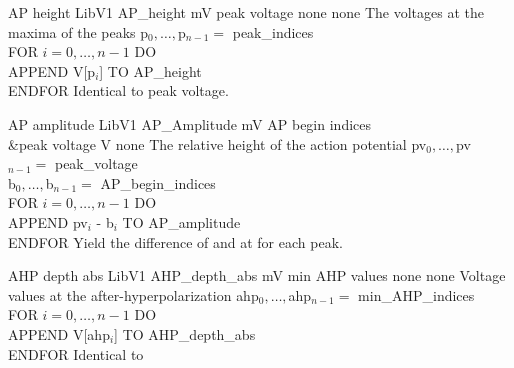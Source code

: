 \begin{efeature}
  {AP height}
  {LibV1}
  {AP\_height}
  {mV}
  {peak voltage}
  {none}
  {none}
  {The voltages at the maxima of the peaks}
  {
  p$_0, \ldots, $p$_{n-1} =$ peak\_indices \\
  FOR $i = 0, \dots, n - 1$ DO \+ \\
    APPEND V[p$_i$] TO AP\_height \- \\
  ENDFOR
  }
  Identical to peak voltage.
\end{efeature}

\begin{efeature}
  {AP amplitude}
  {LibV1}
  {AP\_Amplitude}
  {mV}
  {AP begin indices\\&peak voltage}
  {V}
  {none}
  {The relative height of the action potential}
  {
  pv$_0, \ldots, $pv$_{n-1} =$ peak\_voltage \\
  b$_0, \ldots, $b$_{n-1} =$ AP\_begin\_indices \\
  FOR $i = 0, \dots, n - 1$ DO \+ \\
    APPEND pv$_i$ - b$_i$ TO AP\_amplitude \- \\
  ENDFOR
  }
  Yield the difference of  and  at  for each peak.
  
\end{efeature}

\begin{efeature}
  {AHP depth abs}
  {LibV1}
  {AHP\_depth\_abs}
  {mV}
  {min AHP values}
  {none}
  {none}
  {Voltage values at the after-hyperpolarization}
  {
  ahp$_0, \ldots, $ahp$_{n-1} =$ min\_AHP\_indices \\
  FOR $i = 0, \dots, n - 1$ DO \+ \\
    APPEND V[ahp$_i$] TO AHP\_depth\_abs \- \\
  ENDFOR
  }
  Identical to 
\end{efeature}

